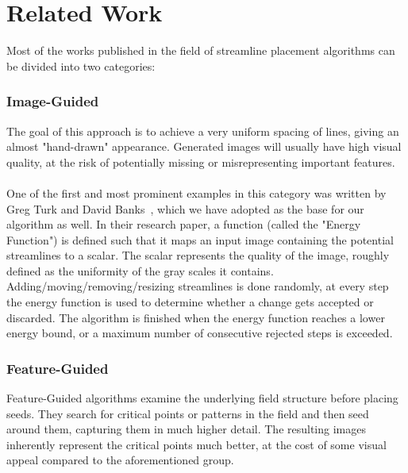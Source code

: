 \chapter{Related Work}
\label{sec:relatedWork}

Most of the works published in the field of streamline placement algorithms can be divided into two categories:
\subsection{Image-Guided}
The goal of this approach is to achieve a very uniform spacing of lines, giving an almost "hand-drawn" appearance.
Generated images will usually have high visual quality, at the risk of potentially missing or misrepresenting important features.
\\\\
One of the first and most prominent examples in this category was written by Greg Turk and David Banks~\cite{TurkBanks},
which we have adopted as the base for our algorithm as well.
In their research paper, a function (called the "Energy Function") is defined such that it maps an input image containing the potential streamlines to a scalar.
The scalar represents the quality of the image, roughly defined as the uniformity of the gray scales it contains. 
Adding/moving/removing/resizing streamlines is done randomly, at every step the energy function is used to determine whether a change gets accepted or discarded.
The algorithm is finished when the energy function reaches a lower energy bound, or a maximum number of consecutive rejected steps is exceeded.


\subsection{Feature-Guided}
Feature-Guided algorithms examine the underlying field structure before placing seeds.
They search for critical points or patterns in the field and then seed around them, capturing them in much higher detail.
The resulting images inherently represent the critical points much better, at the cost of some visual appeal compared to the aforementioned group.
\bigskip

\begin{center}
    
\end{center}


